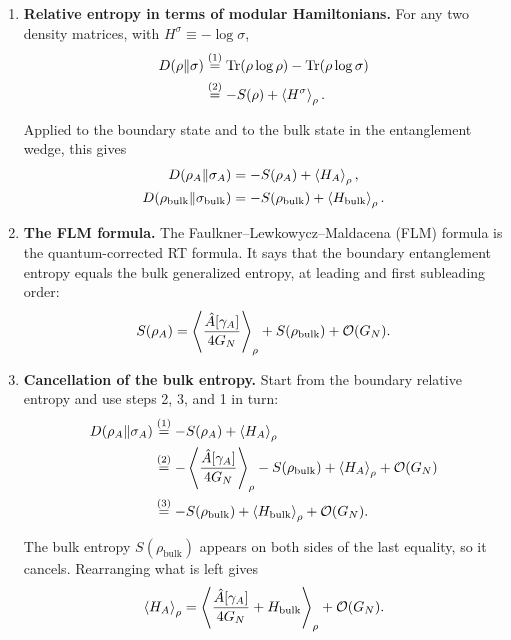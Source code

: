 \begin{keyresult}
\begin{enumerate}[leftmargin=*]
\item \textbf{Relative entropy in terms of modular Hamiltonians.}
For any two density matrices, with $H^\sigma\equiv-\log\sigma$,
\begin{align}
D(\rho\|\sigma) &\overset{(1)}{=} \operatorname{Tr}(\rho\log\rho) - \operatorname{Tr}(\rho\log\sigma) \notag\\
&\overset{(2)}{=} -S(\rho) + \Braket{H^\sigma}_\rho . \notag
\end{align}
\quad
{}

Applied to the boundary state and to the bulk state in the entanglement wedge, this gives
\begin{align*}
D(\rho_A \| \sigma_A) &= -S(\rho_A) + \Braket{H_A}_\rho , \\
D(\rho_{\text{bulk}} \| \sigma_{\text{bulk}}) &= -S(\rho_{\text{bulk}}) + \Braket{H_{\text{bulk}}}_\rho .
\end{align*}

\item \textbf{The FLM formula.}
The Faulkner--Lewkowycz--Maldacena (FLM) formula is the quantum-corrected RT formula. It says that the
boundary entanglement entropy equals the bulk generalized entropy, at leading and first subleading order:
\[
S(\rho_A) = \Braket{\frac{\hat A[\gamma_A]}{4G_N}}_\rho + S(\rho_{\text{bulk}}) + \mathcal{O}(G_N) .
\]

\item \textbf{Cancellation of the bulk entropy.}
Start from the boundary relative entropy and use steps 2, 3, and 1 in turn:
\begin{align}
D(\rho_A \| \sigma_A)
&\overset{(1)}{=} -S(\rho_A) + \Braket{H_A}_\rho \notag\\
&\overset{(2)}{=} -\Braket{\frac{\hat A[\gamma_A]}{4G_N}}_\rho - S(\rho_{\text{bulk}}) + \Braket{H_A}_\rho
  + \mathcal O(G_N) \notag\\
&\overset{(3)}{=} -S(\rho_{\text{bulk}}) + \Braket{H_{\text{bulk}}}_\rho + \mathcal O(G_N) . \notag
\end{align}
\quad
{}\quad
{}

The bulk entropy $S(\rho_{\text{bulk}})$ appears on both sides of the last equality, so it cancels.
Rearranging what is left gives
\[
\Braket{H_A}_\rho = \Braket{\frac{\hat A[\gamma_A]}{4G_N} + H_{\text{bulk}}}_\rho + \mathcal O(G_N) .
\]


\end{enumerate}
\end{keyresult}
